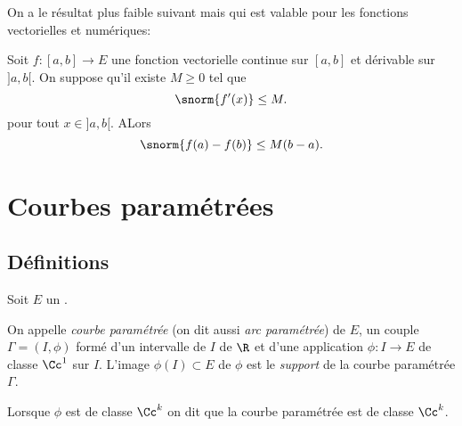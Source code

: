 \sld{\vfill\pagebreak[5]}%

On a le résultat plus faible suivant mais qui est valable pour les fonctions vectorielles et numériques:
\begin{theorem}
	Soit $f:[a,b] \to E$ une fonction vectorielle continue sur $[a,b]$ et dérivable sur $]a,b[$. %
	On suppose qu'il existe $M\geq 0$ tel que 
	\[
		\snorm{f'(x)} \leq M.
	\]
pour tout $x\in ]a,b[$. ALors 
	\[
		\snorm{f(a) -f(b) } \leq M (b-a).
	\]
		\label{TAF}
\end{theorem}


\sld{\vfill\pagebreak[5]}%

\section{Courbes paramétrées}

\subsection{Définitions}

Soit $E$ un \rev{}.

\begin{definition}
	On appelle \emph{courbe paramétrée} (on dit aussi \emph{arc paramétrée}) de $E$, un couple $\Gamma = (I,\phi)$ formé d'un intervalle de $I$ de $\R$ et d'une application $\phi:I \to E$ de classe $\Cc^1$ sur $I$. L'image $\phi(I) \subset E$ de $\phi$ est le \emph{support} de la courbe paramétrée $\Gamma$. 
\end{definition}

\pl{\rep{3cm}}

Lorsque $\phi$ est de classe $\Cc^k$ on dit que la courbe paramétrée est de classe $\Cc^k$.

\begin{exemple}

\pl{\rep{3cm}}
\end{exemple}

